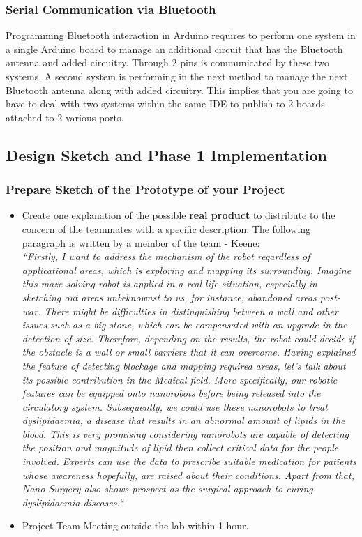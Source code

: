 \documentclass{article}
\begin{document}
\subsubsection{Serial Communication via Bluetooth}
Programming Bluetooth interaction in Arduino requires to perform one system in a single Arduino board to manage an additional circuit that has the Bluetooth antenna and added circuitry. Through 2 pins is communicated by these two systems. A second system is performing in the next method to manage the next Bluetooth antenna along with added circuitry. This implies that you are going to have to deal with two systems within the same IDE to publish to 2 boards attached to 2 various ports.


\subsection{Design Sketch and Phase 1 Implementation}
\subsubsection{Prepare Sketch of the Prototype of your Project
}

\begin{itemize}
    \item Create one explanation of the possible \textbf{real product} to distribute to the concern of the teammates with a specific description. The following paragraph is written by a member of the team - Keene:\\
    \textit{``Firstly, I want to address the mechanism of the robot regardless of applicational areas, which is exploring and mapping its surrounding. Imagine this maze-solving robot is applied in a real-life situation, especially in sketching out areas unbeknownst to us, for instance, abandoned areas post-war. There might be difficulties in distinguishing between a wall and other issues such as a big stone, which can be compensated with an upgrade in the detection of size. Therefore, depending on the results, the robot could decide if the obstacle is a wall or small barriers that it can overcome. Having explained the feature of detecting blockage and mapping required areas, let’s talk about its possible contribution in the Medical field. More specifically, our robotic features can be equipped onto nanorobots before being released into the circulatory system. Subsequently, we could use these nanorobots to treat dyslipidaemia, a disease that results in an abnormal amount of lipids in the blood. This is very promising considering nanorobots are capable of detecting the position and magnitude of lipid then collect critical data for the people involved. Experts can use the data to prescribe suitable medication for patients whose awareness hopefully, are raised about their conditions. Apart from that, Nano Surgery also shows prospect as the surgical approach to curing dyslipidaemia diseases.``}
	\item Project Team Meeting outside the lab within 1 hour.
\end{itemize}
\end{document}
